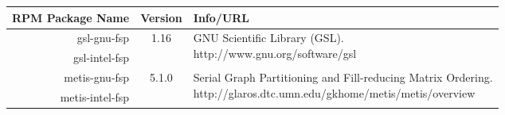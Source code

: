 \small
\begin{tabularx}{\textwidth}{r|c|X}
\toprule
{\bf RPM Package Name} & {\bf Version} & {\bf Info/URL}  \\ 
\midrule

gsl-gnu-fsp & 
\multirow{2}{*}{1.16} & 
\multirow{2}{\linewidth}{GNU Scientific Library (GSL). \newline {\color{blue} http://www.gnu.org/software/gsl}} \\ 
gsl-intel-fsp & 
& \\ 
\hline

metis-gnu-fsp & 
\multirow{2}{*}{5.1.0} & 
\multirow{2}{\linewidth}{Serial Graph Partitioning and Fill-reducing Matrix Ordering. \newline {\color{blue} http://glaros.dtc.umn.edu/gkhome/metis/metis/overview}} \\ 
metis-intel-fsp & 
& \\ 
\hline

\bottomrule
\end{tabularx}
